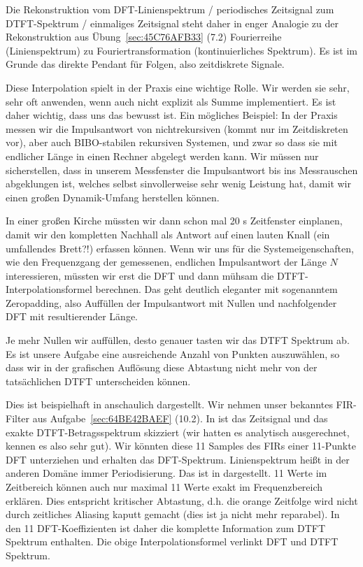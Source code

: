 \begin{Loesung}
Die Rekonstruktion 
vom DFT-Linienspektrum / periodisches Zeitsignal zum
DTFT-Spektrum / einmaliges Zeitsignal steht daher in enger Analogie zu der
Rekonstruktion aus Übung~\ref{sec:45C76AFB33} (7.2) Fourierreihe (Linienspektrum) zu
Fouriertransformation (kontinuierliches Spektrum). Es ist im Grunde das
direkte Pendant für Folgen, also zeitdiskrete Signale.

Diese Interpolation spielt in der Praxis eine wichtige Rolle. Wir werden sie
sehr, sehr oft anwenden, wenn auch nicht explizit als Summe implementiert.
Es ist daher wichtig, dass uns das bewusst ist.
Ein mögliches Beispiel:
In der Praxis messen wir
die Impulsantwort von nichtrekursiven (kommt nur im Zeitdiskreten
vor), aber auch BIBO-stabilen rekursiven Systemen,
und zwar so dass sie mit endlicher Länge in einen Rechner abgelegt werden kann.
%
Wir müssen nur sicherstellen, dass
in unserem Messfenster die Impulsantwort
bis ins Messrauschen abgeklungen ist, welches selbst sinvollerweise sehr wenig
Leistung hat, damit wir einen großen Dynamik-Umfang herstellen können.

In einer großen Kirche müssten wir dann schon mal 20 s Zeitfenster einplanen,
damit wir den kompletten Nachhall als Antwort auf einen lauten Knall (ein umfallendes Brett?!) erfassen
können.
%
Wenn wir uns für die Systemeigenschaften, wie den Frequenzgang der gemessenen,
endlichen Impulsantwort der Länge $N$ interessieren, müssten wir erst die
DFT und dann mühsam die DTFT-Interpolationsformel berechnen. Das geht deutlich
eleganter mit sogenanntem Zeropadding, also Auffüllen der Impulsantwort mit
Nullen und nachfolgender DFT mit resultierender Länge.

Je mehr Nullen wir auffüllen, desto genauer tasten wir das DTFT Spektrum ab.
Es ist unsere Aufgabe eine ausreichende Anzahl von Punkten auszuwählen,
so dass wir in der grafischen Auflösung diese Abtastung nicht mehr
von der tatsächlichen DTFT unterscheiden können.

Dies ist beispielhaft in  anschaulich dargestellt.
Wir nehmen unser bekanntes FIR-Filter aus Aufgabe~\ref{sec:64BE42BAEF} (10.2).
In  ist das Zeitsignal und das exakte DTFT-Betragsspektrum
skizziert (wir hatten es analytisch ausgerechnet, kennen es also sehr gut).
%
Wir könnten diese 11 Samples des FIRs einer 11-Punkte DFT unterziehen und erhalten
das DFT-Spektrum. Linienspektrum heißt in der anderen Domäne immer Periodisierung.
Das ist in  dargestellt. 11 Werte im Zeitbereich
können auch nur maximal 11 Werte exakt im Frequenzbereich erklären. Dies
entspricht kritischer Abtastung, d.h. die orange Zeitfolge wird nicht durch
zeitliches Aliasing kaputt gemacht (dies ist ja nicht mehr reparabel).
In den 11 DFT-Koeffizienten ist daher die komplette Information zum DTFT
Spektrum enthalten. Die obige Interpolationsformel  
verlinkt DFT und DTFT Spektrum.


\end{Loesung}
